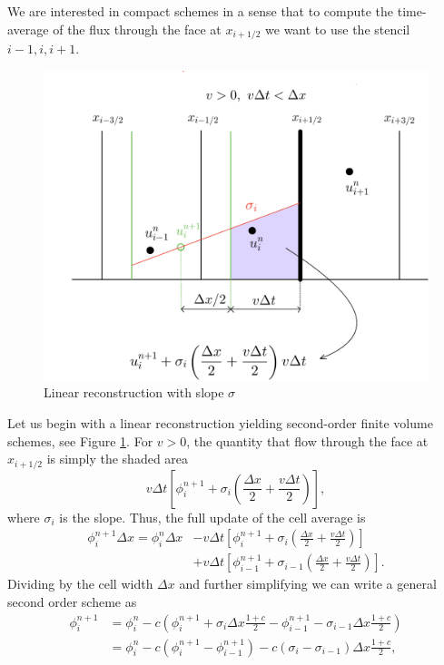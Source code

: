 \documentclass[../thesis.tex]{subfiles}
\begin{document}
We are interested in compact schemes in a sense that to compute the time-average of the flux through the face at \(x_{i+1/2}\) we want to use the stencil \(i-1, i, i+1\).
\begin{figure}[H]
	\centering
	\includegraphics[width=\textwidth]{2nd-order-crop.pdf}
	\caption{Linear reconstruction with slope \(\sigma\)}
	\label{fig:linear-rec-1d}
\end{figure}
Let us begin with a linear reconstruction yielding second-order finite volume schemes, see Figure \ref{fig:linear-rec-1d}.
For \(v>0\), the quantity that flow through the face at \(x_{i+1/2}\) is simply the shaded area
\[ v\Delta t\left[
    \phi_{i}^{n+1} + \sigma_{i}\left( \frac{\Delta x}{2} + \frac{v\Delta t}{2} \right)
\right], \]
where \(\sigma_{i}\) is the slope.
Thus, the full update of the cell average is
\begin{equation}
    \begin{split}
        \phi_{i}^{n+1}\Delta x
        =
        \phi_{i}^{n}\Delta x
        &-v\Delta t\left[
            \phi_{i}^{n+1} + \sigma_{i}\left( \frac{\Delta x}{2} + \frac{v\Delta t}{2} \right)
        \right]
        \\
        &+v\Delta t\left[
            \phi_{i-1}^{n+1} + \sigma_{i-1}\left( \frac{\Delta x}{2} + \frac{v\Delta t}{2} \right)
        \right].
    \end{split}
\end{equation}
Dividing by the cell width \(\Delta x\) and further simplifying we can write a general second order scheme as
\begin{equation}\label{eqn:second-order-implicit}
    \begin{split}
        \phi_{i}^{n+1}
        &= \phi_{i}^{n} - c\left(
            \phi_{i}^{n+1}
            + \sigma_{i}\Delta x\frac{1+c}{2} - \phi_{i-1}^{n+1}
            -\sigma_{i-1}\Delta x\frac{1+c}{2} \right)
        \\
        &= \phi_{i}^{n} - c\left(
            \phi_{i}^{n+1}
            - \phi_{i-1}^{n+1}
            \right)
            -c\left(
            \sigma_{i} - \sigma_{i-1}
            \right)\Delta x\frac{1+c}{2},
    \end{split}
\end{equation}
\end{document}
